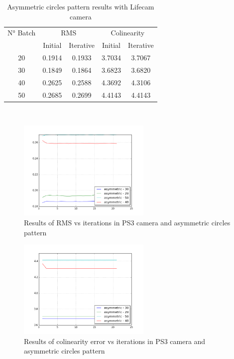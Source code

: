 \documentclass[journal]{IEEEtran}
\begin{document}
\begin{table}[h]
\centering
\caption{Asymmetric circles pattern results with Lifecam camera}
\begin{tabular}{ |c||c|c|c|c|  }
 \hline
 N° Batch & \multicolumn{2}{c|}{RMS} & \multicolumn{2}{c|}{Colinearity}\\
 \cline{2-5}
 & Initial & Iterative & Initial & Iterative \\
 \hline
 20        & 0.1914 & 0.1933 & 3.7034 & 3.7067 \\
 30        & 0.1849 & 0.1864 & 3.6823 & 3.6820 \\
 40        & 0.2625 & 0.2588 & 4.3692 & 4.3106 \\
 50        & 0.2685 & 0.2699 & 4.4143 & 4.4143 \\
 \hline
\end{tabular}
\\
\end{table}

\begin{figure}[H]
\centering
\includegraphics[width=2.5in]{_img/report_4/img_results_ps3_asymmetric.png}
\caption{Results of RMS vs iterations in PS3 camera and asymmetric circles pattern}
\end{figure}

\begin{figure}[H]
\centering
\includegraphics[width=2.5in]{_img/report_4/img_results_ps3_colinearity_asymmetric.png}
\caption{Results of colinearity error vs iterations in PS3 camera and asymmetric circles pattern}
\end{figure}
\end{document}
